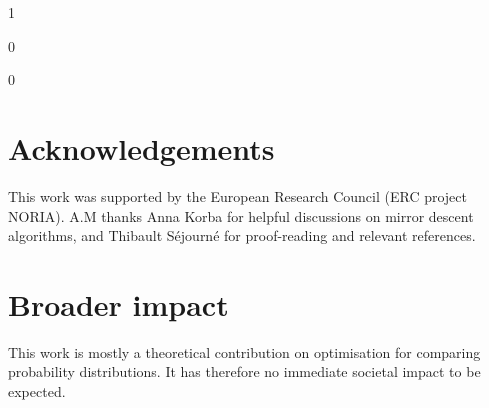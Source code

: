 \documentclass{article}
\def\icml{1}
\begin{document}
\if\icml1

\else

\fi

\begin{abstract}
  
\end{abstract}

\if\icml0
\medskip
\fi













\if\icml0
\section{Acknowledgements}
This work was supported by the European Research Council (ERC project NORIA). A.M thanks Anna Korba for helpful discussions on mirror descent algorithms, and Thibault Séjourné for proof-reading and relevant references.
\fi

\vfill

\section*{Broader impact}

This work is mostly a theoretical contribution on optimisation for comparing probability distributions. It has therefore no immediate societal impact to be expected.

\printbibliography

\appendix

\onecolumn


\end{document}
